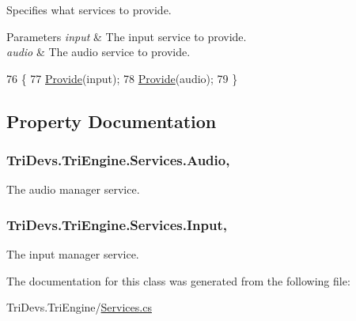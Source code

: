 Specifies what services to provide. 


\begin{DoxyParams}{Parameters}
{\em input} & The input service to provide.\\
\hline
{\em audio} & The audio service to provide.\\
\hline
\end{DoxyParams}

\begin{DoxyCode}
76         \{
77             \hyperlink{class_tri_devs_1_1_tri_engine_1_1_services_a1a6c1db541be81163fc36225dbf1df63}{Provide}(input);
78             \hyperlink{class_tri_devs_1_1_tri_engine_1_1_services_a1a6c1db541be81163fc36225dbf1df63}{Provide}(audio);
79         \}
\end{DoxyCode}


\subsection{Property Documentation}
\hypertarget{class_tri_devs_1_1_tri_engine_1_1_services_a005c83f0dc7bf15ced5a3d81f193675f}{
\subsubsection[{Audio}]{ Tri\-Devs.\-Tri\-Engine.\-Services.\-Audio\hspace{0.3cm}{\ttfamily [static]}, {\ttfamily [get]}}}\label{class_tri_devs_1_1_tri_engine_1_1_services_a005c83f0dc7bf15ced5a3d81f193675f}


The audio manager service. 

\hypertarget{class_tri_devs_1_1_tri_engine_1_1_services_af51da9ebcfd767c213f7264cac9926a5}{
\subsubsection[{Input}]{ Tri\-Devs.\-Tri\-Engine.\-Services.\-Input\hspace{0.3cm}{\ttfamily [static]}, {\ttfamily [get]}}}\label{class_tri_devs_1_1_tri_engine_1_1_services_af51da9ebcfd767c213f7264cac9926a5}


The input manager service. 



The documentation for this class was generated from the following file\-:\begin{DoxyCompactItemize}
\item 
Tri\-Devs.\-Tri\-Engine/\hyperlink{_services_8cs}{Services.\-cs}\end{DoxyCompactItemize}
